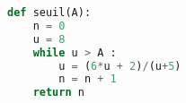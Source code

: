 \begin{center}
\begin{lstlisting}[language=Python]
def seuil(A):
	n = 0
	u = 8
	while u > A :
		u = (6*u + 2)/(u+5)
		n = n + 1
	return n
\end{lstlisting}
\end{center}